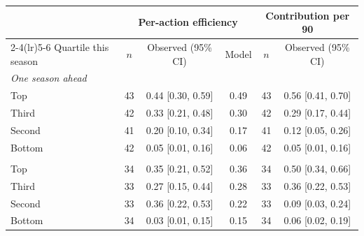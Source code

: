 \begin{tabular}{lccccc}
\toprule
 & \multicolumn{3}{c}{Per-action efficiency} & \multicolumn{2}{c}{Contribution per 90} \\
\cmidrule(lr){2-4}\cmidrule(lr){5-6}
Quartile this season & $n$ & Observed (95\% CI) & Model & $n$ & Observed (95\% CI) \\
\midrule
\multicolumn{6}{l}{\textit{One season ahead}} \\
Top & 43 & 0.44 [0.30, 0.59] & 0.49 & 43 & 0.56 [0.41, 0.70] \\
Third & 42 & 0.33 [0.21, 0.48] & 0.30 & 42 & 0.29 [0.17, 0.44] \\
Second & 41 & 0.20 [0.10, 0.34] & 0.17 & 41 & 0.12 [0.05, 0.26] \\
Bottom & 42 & 0.05 [0.01, 0.16] & 0.06 & 42 & 0.05 [0.01, 0.16] \\
\addlinespace
\multicolumn{6}{l}{\textit{Two seasons ahead}} \\
Top & 34 & 0.35 [0.21, 0.52] & 0.36 & 34 & 0.50 [0.34, 0.66] \\
Third & 33 & 0.27 [0.15, 0.44] & 0.28 & 33 & 0.36 [0.22, 0.53] \\
Second & 33 & 0.36 [0.22, 0.53] & 0.22 & 33 & 0.09 [0.03, 0.24] \\
Bottom & 34 & 0.03 [0.01, 0.15] & 0.15 & 34 & 0.06 [0.02, 0.19] \\
\bottomrule
\end{tabular}
